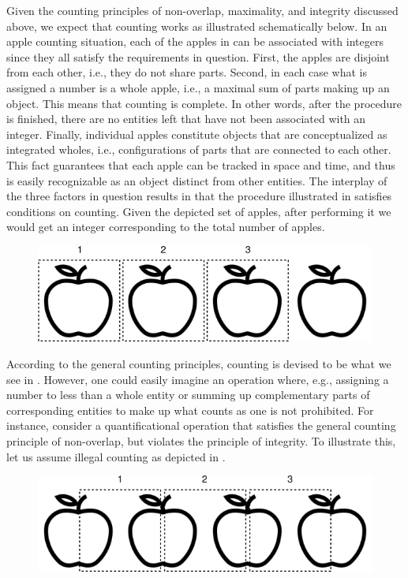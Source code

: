 Given the counting principles of non-overlap, maximality, and integrity discussed above, we expect that counting works as illustrated schematically below. In an apple counting situation, each of the apples in  can be associated with integers since they all satisfy the requirements in question. First, the apples are disjoint from each other, i.e., they do not share parts. Second, in each case what is assigned a number is a whole apple, i.e., a maximal sum of parts making up an object. This means that counting is complete. In other words, after the procedure is finished, there are no entities left that have not been associated with an integer. Finally, individual apples constitute objects that are conceptualized as integrated wholes, i.e., configurations of parts that are connected to each other. This fact guarantees that each apple can be tracked in space and time, and thus is easily recognizable as an object distinct from other entities. The interplay of the three factors in question results in that the procedure illustrated in  satisfies conditions on counting. Given the depicted set of apples, after performing it we would get an integer corresponding to the total number of apples.

\begin{figure}[h!]
\centering
\includegraphics[scale=0.5]{figures/apples_counting.png}
\label{fig:counting}
\end{figure}

According to the general counting principles, counting is devised to be what we see in . However, one could easily imagine an operation where, e.g., assigning a number to less than a whole entity or summing up complementary parts of corresponding entities to make up what counts as one is not prohibited. For instance, consider a quantificational operation that satisfies the general counting principle of non-overlap, but violates the principle of integrity. To illustrate this, let us assume illegal counting as depicted in .

\begin{figure}[h!]
\centering
\includegraphics[scale=0.5]{figures/apples_not-counting.png}
\label{fig:illegal-counting}
\end{figure}

